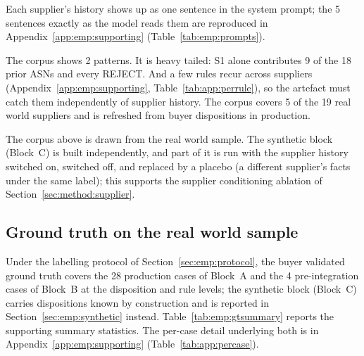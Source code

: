 Each supplier's history shows up as one sentence in the system prompt; the 5 sentences exactly as the model reads them are reproduced in Appendix~\ref{app:emp:supporting} (Table~\ref{tab:emp:prompts}).


The corpus shows 2 patterns. It is heavy tailed: S1 alone contributes 9 of the 18 prior ASNs and every REJECT. And a few rules recur across suppliers (Appendix~\ref{app:emp:supporting}, Table~\ref{tab:app:perrule}), so the artefact must catch them independently of supplier history. The corpus covers 5 of the 19 real world suppliers and is refreshed from buyer dispositions in production.

The corpus above is drawn from the real world sample. The synthetic block (Block~C) is built independently, and part of it is run with the supplier history switched on, switched off, and replaced by a placebo (a different supplier's facts under the same label); this supports the supplier conditioning ablation of Section~\ref{sec:method:supplier}.


\subsection{Ground truth on the real world sample}
\label{sec:emp:groundtruth}

Under the labelling protocol of Section~\ref{sec:emp:protocol}, the buyer validated ground truth covers the 28 production cases of Block~A and the 4 pre-integration cases of Block~B at the disposition and rule levels; the synthetic block (Block~C) carries dispositions known by construction and is reported in Section~\ref{sec:emp:synthetic} instead. Table~\ref{tab:emp:gtsummary} reports the supporting summary statistics. The per-case detail underlying both is in Appendix~\ref{app:emp:supporting} (Table~\ref{tab:app:percase}).

